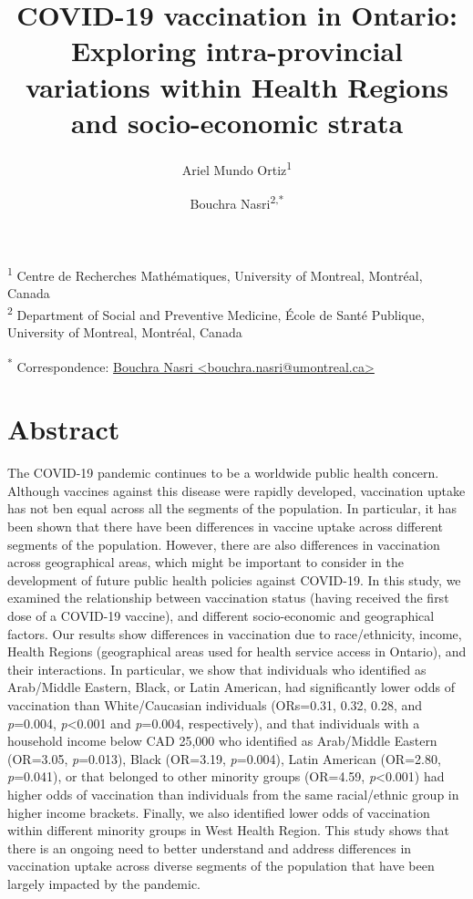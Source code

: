 \documentclass[
  letterpaper,
  DIV=11,
  numbers=noendperiod]{scrartcl}
\title{\textbf{COVID-19 vaccination in Ontario: Exploring
intra-provincial variations within Health Regions and socio-economic
strata}}
\author{Ariel Mundo Ortiz\textsuperscript{1} \and Bouchra
Nasri\textsuperscript{2,*}}
\date{}
\begin{document}
\maketitle
\ifdefined\Shaded\renewenvironment{Shaded}{\begin{tcolorbox}[borderline west={3pt}{0pt}{shadecolor}, boxrule=0pt, enhanced, breakable, interior hidden, sharp corners, frame hidden]}{\end{tcolorbox}}\fi

\textsuperscript{1} Centre de Recherches Mathématiques, University of
Montreal, Montréal, Canada\\
\textsuperscript{2} Department of Social and Preventive Medicine, École
de Santé Publique, University of Montreal, Montréal, Canada

\textsuperscript{*} Correspondence:
\href{mailto:bouchra.nasri@umontreal.ca}{Bouchra Nasri
\textless{}bouchra.nasri@umontreal.ca\textgreater{}}

\hypertarget{abstract}{%
\section{Abstract}\label{abstract}}

The COVID-19 pandemic continues to be a worldwide public health concern.
Although vaccines against this disease were rapidly developed,
vaccination uptake has not ben equal across all the segments of the
population. In particular, it has been shown that there have been
differences in vaccine uptake across different segments of the
population. However, there are also differences in vaccination across
geographical areas, which might be important to consider in the
development of future public health policies against COVID-19. In this
study, we examined the relationship between vaccination status (having
received the first dose of a COVID-19 vaccine), and different
socio-economic and geographical factors. Our results show differences in
vaccination due to race/ethnicity, income, Health Regions (geographical
areas used for health service access in Ontario), and their
interactions. In particular, we show that individuals who identified as
Arab/Middle Eastern, Black, or Latin American, had significantly lower
odds of vaccination than White/Caucasian individuals (ORs=0.31, 0.32,
0.28, and \emph{p}=0.004, \emph{p}\textless0.001 and \emph{p}=0.004,
respectively), and that individuals with a household income below CAD
25,000 who identified as Arab/Middle Eastern (OR=3.05, \emph{p}=0.013),
Black (OR=3.19, \emph{p}=0.004), Latin American (OR=2.80,
\emph{p}=0.041), or that belonged to other minority groups (OR=4.59,
\emph{p}\textless0.001) had higher odds of vaccination than individuals
from the same racial/ethnic group in higher income brackets. Finally, we
also identified lower odds of vaccination within different minority
groups in West Health Region. This study shows that there is an ongoing
need to better understand and address differences in vaccination uptake
across diverse segments of the population that have been largely
impacted by the pandemic.
\end{document}

